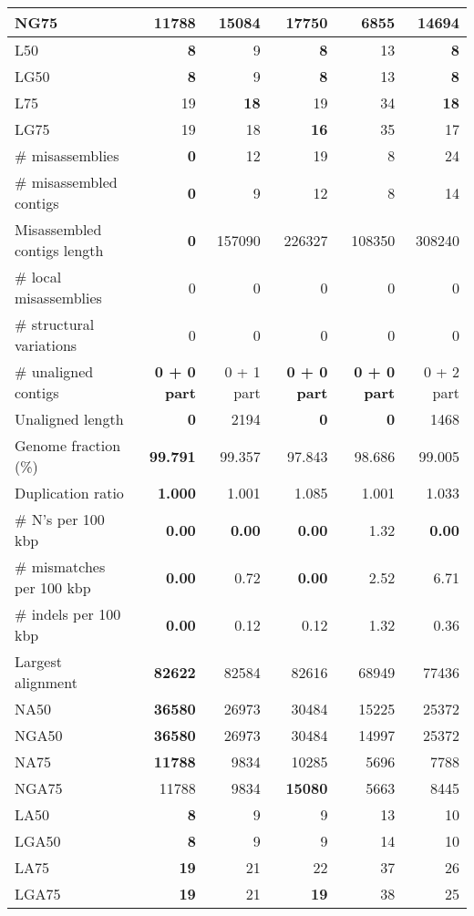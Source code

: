 \documentclass[12pt,a4paper]{article}
\begin{document}
\begin{table}[ht]
\begin{center}
\begin{tabular}{|l*{5}{|r}|}
NG75 & 11788 & 15084 & {\bf 17750} & 6855 & 14694 \\ \hline
L50 & {\bf 8} & 9 & {\bf 8} & 13 & {\bf 8} \\ \hline
LG50 & {\bf 8} & 9 & {\bf 8} & 13 & {\bf 8} \\ \hline
L75 & 19 & {\bf 18} & 19 & 34 & {\bf 18} \\ \hline
LG75 & 19 & 18 & {\bf 16} & 35 & 17 \\ \hline
\# misassemblies & {\bf 0} & 12 & 19 & 8 & 24 \\ \hline
\# misassembled contigs & {\bf 0} & 9 & 12 & 8 & 14 \\ \hline
Misassembled contigs length & {\bf 0} & 157090 & 226327 & 108350 & 308240 \\ \hline
\# local misassemblies & 0 & 0 & 0 & 0 & 0 \\ \hline
\# structural variations & 0 & 0 & 0 & 0 & 0 \\ \hline
\# unaligned contigs & {\bf 0 + 0 part} & 0 + 1 part & {\bf 0 + 0 part} & {\bf 0 + 0 part} & 0 + 2 part \\ \hline
Unaligned length & {\bf 0} & 2194 & {\bf 0} & {\bf 0} & 1468 \\ \hline
Genome fraction (\%) & {\bf 99.791} & 99.357 & 97.843 & 98.686 & 99.005 \\ \hline
Duplication ratio & {\bf 1.000} & 1.001 & 1.085 & 1.001 & 1.033 \\ \hline
\# N's per 100 kbp & {\bf 0.00} & {\bf 0.00} & {\bf 0.00} & 1.32 & {\bf 0.00} \\ \hline
\# mismatches per 100 kbp & {\bf 0.00} & 0.72 & {\bf 0.00} & 2.52 & 6.71 \\ \hline
\# indels per 100 kbp & {\bf 0.00} & 0.12 & 0.12 & 1.32 & 0.36 \\ \hline
Largest alignment & {\bf 82622} & 82584 & 82616 & 68949 & 77436 \\ \hline
NA50 & {\bf 36580} & 26973 & 30484 & 15225 & 25372 \\ \hline
NGA50 & {\bf 36580} & 26973 & 30484 & 14997 & 25372 \\ \hline
NA75 & {\bf 11788} & 9834 & 10285 & 5696 & 7788 \\ \hline
NGA75 & 11788 & 9834 & {\bf 15080} & 5663 & 8445 \\ \hline
LA50 & {\bf 8} & 9 & 9 & 13 & 10 \\ \hline
LGA50 & {\bf 8} & 9 & 9 & 14 & 10 \\ \hline
LA75 & {\bf 19} & 21 & 22 & 37 & 26 \\ \hline
LGA75 & {\bf 19} & 21 & {\bf 19} & 38 & 25 \\ \hline
\end{tabular}
\end{center}
\end{table}
\end{document}
